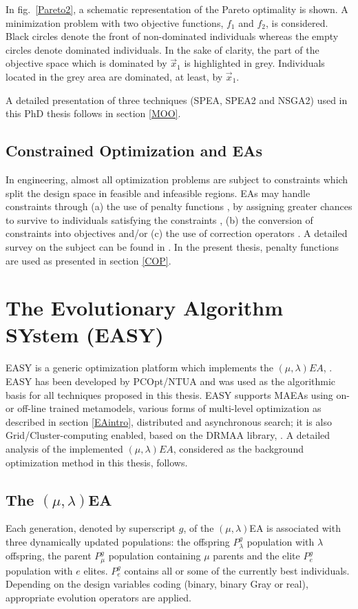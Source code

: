 In fig.\ \ref{Pareto2}, a schematic representation of the Pareto optimality is shown. A minimization problem with two objective functions, $f_1$ and $f_2$, is considered. Black circles denote the front of non-dominated individuals whereas the empty circles denote dominated individuals. In the sake of clarity, the part of the objective space which is dominated by $\vec{x}_1$ is highlighted in grey. Individuals located in the grey area are dominated, at least, by $\vec{x}_1$. 

A detailed presentation of three techniques (SPEA, SPEA2 and NSGA2) used in this PhD thesis follows in section \ref{MOO}.

\subsection{Constrained Optimization and EAs}
\label{COPini}
In engineering, almost all optimization problems are subject to constraints which split the design space in feasible and infeasible regions. EAs may handle constraints through (a) the use of penalty functions \cite{Deb00,morales98}, by assigning greater chances to survive to individuals satisfying the constraints \cite{powell93}, (b) the conversion of constraints into objectives \cite{surry95,surry97} and/or (c) the use of correction operators \cite{mich94}. A detailed survey on the subject can be found in \cite{mich96,coello02}. In the present thesis, penalty functions are used as presented in section \ref{COP}. 

\section{The Evolutionary Algorithm SYstem (EASY)}
\label{EASY_def}
EASY is a generic optimization platform which implements the $(\mu,\lambda)EA$, \cite{phd_Giotis,phd_Karakasis,phd_Kampolis,EASYsite}. EASY has been developed by PCOpt/NTUA and was used as the algorithmic basis for all techniques proposed in this thesis. EASY supports MAEAs using on- or off-line trained metamodels, various forms of multi-level optimization as described in section \ref{EAintro}, distributed and asynchronous search; it is also Grid/Cluster-computing enabled, based on the DRMAA library, \cite{phd_Liakopoulos}. A detailed analysis of the implemented $(\mu,\lambda)EA$, considered as the background optimization method in this thesis, follows.  


\subsection{The $(\mu,\lambda)$EA}
\label{MLEA}
Each generation, denoted by superscript $g$, of the $(\mu,\lambda)$EA is associated with three dynamically updated populations: the offspring $P_{\lambda}^g$ population with $\lambda$ offspring, the parent $P_{\mu}^g$ population containing $\mu$ parents and the elite $P_{e}^g$ population with $e$ elites. $P_{e}^g$ contains all or some of the currently best individuals. Depending on the design variables coding (binary, binary Gray or real), appropriate evolution operators are applied. 

